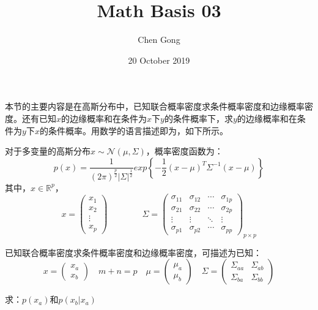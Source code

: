 \documentclass[a4paper]{article}
\title{Math Basis 03}
\author{Chen Gong}
\date{20 October 2019}
\begin{document}
\maketitle
本节的主要内容是在高斯分布中，已知联合概率密度求条件概率密度和边缘概率密度。还有已知$x$的边缘概率和在条件为$x$下$y$的条件概率下，求$y$的边缘概率和在条件为$y$下$x$的条件概率。用数学的语言描述即为，如下所示。

对于多变量的高斯分布$x\sim \mathcal{N}(\mu,\Sigma)$，概率密度函数为：
\begin{equation}
    p(x)=\frac{1}{(2\pi)^{\frac{p}{2}}|\Sigma|^{\frac{1}{2}}}exp\left\{ -\frac{1}{2}(x-\mu)^T\Sigma^{-1}(x-\mu) \right\}
\end{equation}
其中，$x\in\mathbb{R}^p$，
\begin{equation}
    x=
    \begin{pmatrix}
        x_1 \\
        x_2 \\
        \vdots \\
        x_p
    \end{pmatrix} \qquad \qquad
    \Sigma = 
    \begin{pmatrix}
        \sigma_{11} & \sigma_{12} & \cdots & \sigma_{1p} \\
        \sigma_{21} & \sigma_{22} & \cdots & \sigma_{2p} \\
        \vdots      & \vdots      & \ddots & \vdots      \\
        \sigma_{p1} & \sigma_{p2} & \cdots & \sigma_{pp}
        \end{pmatrix}_{p\times p}
\end{equation}

已知联合概率密度求条件概率密度和边缘概率密度，可描述为已知：
\begin{equation}
    x= 
    \begin{pmatrix}
        x_a \\
        x_b
    \end{pmatrix}
    \quad m+n=p \quad
    \mu=
    \begin{pmatrix}
        \mu_a \\
        \mu_b
    \end{pmatrix} \quad
    \Sigma=
    \begin{pmatrix}
    \Sigma_{aa} & \Sigma_{ab} \\
    \Sigma_{ba} & \Sigma_{bb} 
    \end{pmatrix}
\end{equation}

求：$p(x_a)$和$p(x_b|x_a)$
\end{document}

